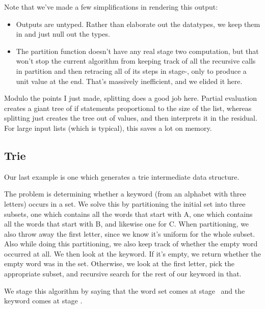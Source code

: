 Note that we've made a few simplifications in rendering this output:
\begin{itemize}
\item Outputs are untyped.  Rather than elaborate out the datatypes, we keep them in and just null out the types.
\item The partition function doesn't have any real stage two computation,
but that won't stop the current algorithm from keeping track of all the recursive calls in partition 
and then retracing all of its steps in stage-\bbtwo, only to produce a unit value at the end.  
That's massively inefficient, and we elided it here.
\end{itemize}

Modulo the points I just made, splitting does a good job here.  
Partial evaluation creates a giant tree of if statements proportional to the size of the list,
whereas splitting just creates the tree out of values, and then interprets it in the residual.
For large input lists (which is typical), this saves a lot on memory.

\subsection{Trie}

Our last example is one which generates a trie intermediate data structure.

The problem is determining whether a keyword (from an alphabet with three letters) occurs in a set.
We solve this by partitioning the initial set into three subsets,
one which contains all the words that start with A,
one which contains all the words that start with B, and likewise one for C.
When partitioning, we also throw away the first letter, since we know it's uniform for the whole subset.
Also while doing this partitioning, we also keep track of whether the empty word occurred at all.
We then look at the keyword.  If it's empty, we return whether the empty word was in the set.
Otherwise, we look at the first letter, pick the appropriate subset, 
and recursive search for the rest of our keyword in that.

We stage this algorithm by saying that the word set comes at stage \bbone\
and the keyword comes at stage \bbtwo.

